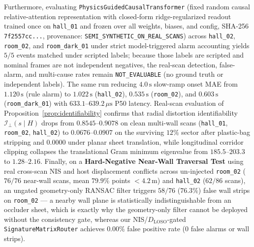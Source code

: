 \documentclass[journal]{IEEEtran}
\begin{document}
Furthermore, evaluating \texttt{PhysicsGuided\allowbreak Causal\allowbreak Transformer} (fixed random causal relative-attention representation with closed-form ridge-regularized readout trained once on \texttt{hall\_01} and frozen over all weights, biases, and config, SHA-256 \texttt{7f2557cc...}, provenance: \texttt{SEMI\_\allowbreak SYNTHETIC\_\allowbreak ON\_\allowbreak REAL\_\allowbreak SCANS}) across \texttt{hall\_02}, \texttt{room\_02}, and \texttt{room\_dark\_01} under strict model-triggered alarm accounting yields $5/5$ events matched under scripted labels; because those labels are scripted and nominal frames are not independent negatives, the real-scan detection, false-alarm, and multi-cause rates remain \texttt{NOT\_EVALUABLE} (no ground truth or independent labels). The same run reducing $4.0\,\mathrm{s}$ slow-ramp onset MAE from $1.120\,\mathrm{s}$ (rule alarm) to $\mathbf{1.022\,\mathrm{s}}$ (\texttt{hall\_02}), $\mathbf{0.535\,\mathrm{s}}$ (\texttt{room\_02}), and $\mathbf{0.603\,\mathrm{s}}$ (\texttt{room\_dark\_01}) with $633.1\text{--}639.2\,\mu\mathrm{s}$ P50 latency. Real-scan evaluation of Proposition~\ref{prop:identifiability} confirms that radial distortion identifiability $\mathcal{I}_\perp(s \mid H)$ drops from $\mathbf{0.8545\text{--}0.9078}$ on clean multi-wall scans (\texttt{hall\_01}, \texttt{room\_02}, \texttt{hall\_02}) to $\mathbf{0.0676\text{--}0.0907}$ on the surviving $12\%$ sector after plastic-bag stripping and $\mathbf{0.0000}$ under planar sheet translation, while longitudinal corridor clipping collapses the translational Gram minimum eigenvalue from $185.5\text{--}203.3$ to $\mathbf{1.28\text{--}2.16}$. Finally, on a \textbf{Hard-Negative Near-Wall Traversal Test} using real cross-scan NIS and host displacement conflicts across un-injected \texttt{room\_02} ($76/76$ near-wall scans, mean $79.9\%$ points $<4.2\,\mathrm{m}$) and \texttt{hall\_02} ($62/86$ scans), an ungated geometry-only RANSAC filter triggers $58/76$ ($76.3\%$) false wall strips on \texttt{room\_02} --- a nearby wall plane is statistically indistinguishable from an occluder sheet, which is exactly why the geometry-only filter cannot be deployed without the consistency gate, whereas our NIS/$D_{\mathrm{LOSO}}$-gated \texttt{Signature\allowbreak Matrix\allowbreak Router} achieves $\mathbf{0.00\%}$ false positive rate ($0$ false alarms or wall strips).
\end{document}

